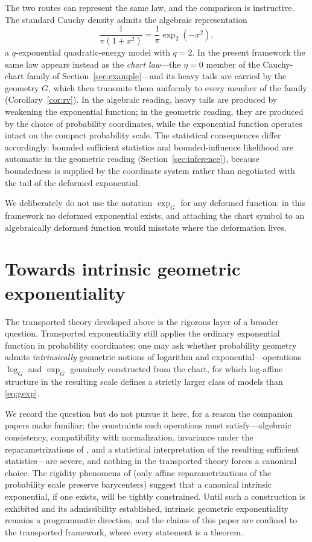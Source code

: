 \documentclass[11pt]{article}
\theoremstyle{definition}
\begin{document}
The two routes can represent the same law, and the comparison is
instructive. The standard Cauchy density admits the algebraic
representation
\[
\frac1{\pi(1+x^2)}=\frac1\pi\exp_2(-x^2),
\]
a $q$-exponential quadratic-energy model with $q=2$. In the present
framework the same law appears instead as the \emph{chart law}---the
$\eta=0$ member of the Cauchy-chart family of
Section~\ref{sec:example}---and its heavy tails are carried by the
geometry $G$, which then transmits them uniformly to every member of the
family (Corollary~\ref{cor:rv}). In the algebraic reading, heavy tails are
produced by weakening the exponential function; in the geometric reading,
they are produced by the choice of probability coordinates, while the
exponential function operates intact on the compact probability scale. The
statistical consequences differ accordingly: bounded sufficient statistics
and bounded-influence likelihood are automatic in the geometric reading
(Section~\ref{sec:inference}), because boundedness is supplied by the
coordinate system rather than negotiated with the tail of the deformed
exponential.

We deliberately do not use the notation $\exp_G$ for any deformed
function: in this framework no deformed exponential exists, and attaching
the chart symbol to an algebraically deformed function would misstate
where the deformation lives.

\section{Towards intrinsic geometric exponentiality}\label{sec:intrinsic}

The transported theory developed above is the rigorous layer of a broader
question. Transported exponentiality still applies the ordinary
exponential function in probability coordinates; one may ask whether
probability geometry admits \emph{intrinsically} geometric notions of
logarithm and exponential---operations $\log_G$ and $\exp_G$ genuinely
constructed from the chart, for which log-affine structure in the
resulting scale defines a strictly larger class of models than
\eqref{eq:gexp}.

We record the question but do not pursue it here, for a reason the
companion papers make familiar: the constraints such operations must
satisfy---algebraic consistency, compatibility with normalization,
invariance under the reparametrizations of \cite{Cojocea2026a}, and a
statistical interpretation of the resulting sufficient statistics---are
severe, and nothing in the transported theory forces a canonical choice.
The rigidity phenomena of \cite{Cojocea2026a} (only affine
reparametrizations of the probability scale preserve barycenters) suggest
that a canonical intrinsic exponential, if one exists, will be tightly
constrained. Until such a construction is exhibited and its admissibility
established, intrinsic geometric exponentiality remains a programmatic
direction, and the claims of this paper are confined to the transported
framework, where every statement is a theorem.
\end{document}
